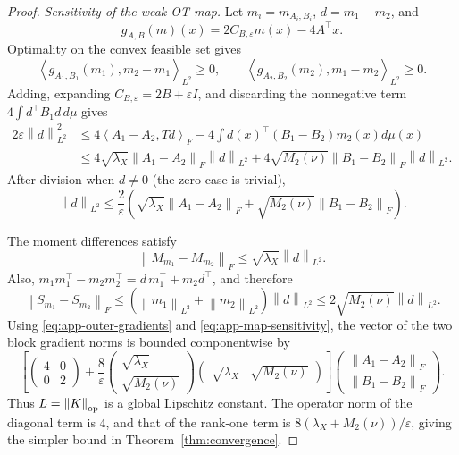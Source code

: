 \documentclass[11pt]{article}
\newcommand{\ip}[2]{\left\langle #1,#2\right\rangle}
\newcommand{\norm}[1]{\left\lVert #1\right\rVert}
\theoremstyle{plain}
\theoremstyle{definition}
\theoremstyle{remark}
\begin{document}
\begin{proof}
\emph{Sensitivity of the weak OT map.}
Let $m_i=m_{A_i,B_i}$, $d=m_1-m_2$, and
\[
 g_{A,B}(m)(x)=2C_{B,\varepsilon}m(x)-4A^\top x.
\]
Optimality on the convex feasible set gives
\[
 \ip{g_{A_1,B_1}(m_1)}{m_2-m_1}_{L^2}\ge0,\qquad
 \ip{g_{A_2,B_2}(m_2)}{m_1-m_2}_{L^2}\ge0.
\]
Adding, expanding $C_{B,\varepsilon}=2B+\varepsilon I$, and discarding the
nonnegative term $4\int d^\top B_1d\,d\mu$ gives
\begin{align*}
 2\varepsilon\norm d_{L^2}^2
 &\le4\ip{A_1-A_2}{Td}_F
 -4\int d(x)^\top(B_1-B_2)m_2(x)d\mu(x)\\
 &\le4\sqrt{\lambda_X}\norm{A_1-A_2}_F\norm d_{L^2}
 +4\sqrt{M_2(\nu)}\norm{B_1-B_2}_F\norm d_{L^2}.
\end{align*}
After division when $d\ne0$ (the zero case is trivial),
\begin{equation}\label{eq:app-map-sensitivity}
 \norm d_{L^2}
 \le\frac2\varepsilon\left(
 \sqrt{\lambda_X}\norm{A_1-A_2}_F+
 \sqrt{M_2(\nu)}\norm{B_1-B_2}_F\right).
\end{equation}

The moment differences satisfy
\[
 \norm{M_{m_1}-M_{m_2}}_F\le\sqrt{\lambda_X}\norm d_{L^2}.
\]
Also,
$m_1m_1^\top-m_2m_2^\top=d\,m_1^\top+m_2d^\top$, and therefore
\[
 \norm{S_{m_1}-S_{m_2}}_F
 \le(\norm{m_1}_{L^2}+\norm{m_2}_{L^2})\norm d_{L^2}
 \le2\sqrt{M_2(\nu)}\norm d_{L^2}.
\]
Using \eqref{eq:app-outer-gradients} and \eqref{eq:app-map-sensitivity}, the
vector of the two block gradient norms is bounded componentwise by
\[
 \left[
 \begin{pmatrix}4&0\\0&2\end{pmatrix}
 +\frac8\varepsilon
 \begin{pmatrix}\sqrt{\lambda_X}\\\sqrt{M_2(\nu)}\end{pmatrix}
 \begin{pmatrix}\sqrt{\lambda_X}&\sqrt{M_2(\nu)}\end{pmatrix}
 \right]
 \begin{pmatrix}\norm{A_1-A_2}_F\\\norm{B_1-B_2}_F\end{pmatrix}.
\]
Thus $L=\norm K_{\rm op}$ is a global Lipschitz constant.  The operator norm of
the diagonal term is $4$, and that of the rank-one term is
$8(\lambda_X+M_2(\nu))/\varepsilon$, giving the simpler bound in
Theorem~\ref{thm:convergence}.


\end{proof}
\end{document}
